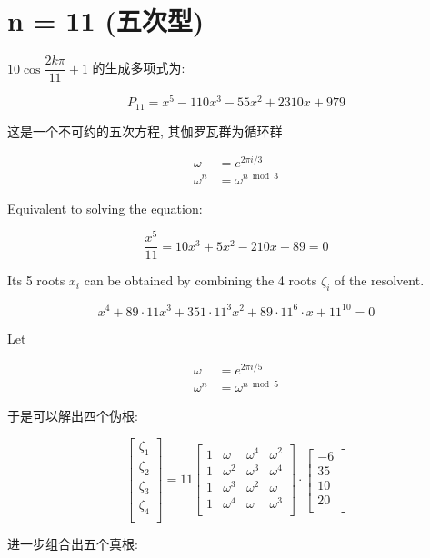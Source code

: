 \chapter{n = 11 (五次型)}\label{ch:cos11}

$10\cos\dfrac{2kπ}{11}+1$ 的生成多项式为:

$$
P_{11} = x^5-110 x^3-55 x^2+2310 x+979
$$

这是一个不可约的五次方程, 其伽罗瓦群为循环群

$$
\begin{aligned}
ω&= e^{2πi/3}\\
ω^n&=ω^{n\bmod 3}
\end{aligned}
$$


Equivalent to solving the equation:

$$\frac{x^5}{11}=10x^3+5x^2-210x-89=0$$

Its 5 roots $x_i$ can be obtained by combining the 4 roots $ζ_i$ of the resolvent.

$$
x^4+89⋅11x^3+351⋅11^3x^2+89⋅11^6⋅x+11^{10}=0
$$

Let 

$$
\begin{aligned}
ω&= e^{2πi/5}\\
ω^n&=ω^{n\bmod 5} 
\end{aligned}
$$

于是可以解出四个伪根:

$$
\begin{bmatrix}
ζ_1\\ζ_2\\ζ_3\\ζ_4\\
\end{bmatrix}=
11\begin{bmatrix}
1 & ω   & ω^4 & ω^2 \\
1 & ω^2 & ω^3 & ω^4 \\
1 & ω^3 & ω^2 & ω \\
1 & ω^4 & ω   & ω^3 \\
\end{bmatrix}⋅
\begin{bmatrix}
-6\\35\\10\\20\\
\end{bmatrix}
$$

进一步组合出五个真根:

